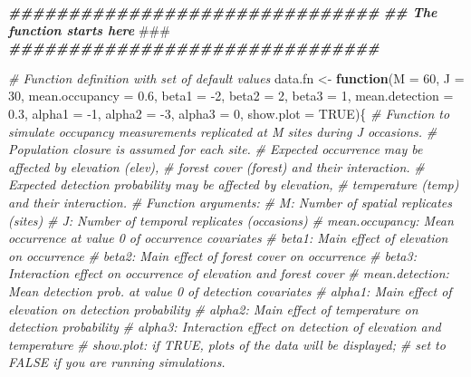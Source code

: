 \documentclass[
]{book}
\newenvironment{Shaded}{\begin{snugshade}}{\end{snugshade}}
\newcommand{\AlertTok}[1]{\textcolor[rgb]{0.94,0.16,0.16}{#1}}
\newcommand{\AttributeTok}[1]{\textcolor[rgb]{0.77,0.63,0.00}{#1}}
\newcommand{\CommentTok}[1]{\textcolor[rgb]{0.56,0.35,0.01}{\textit{#1}}}
\newcommand{\ConstantTok}[1]{\textcolor[rgb]{0.00,0.00,0.00}{#1}}
\newcommand{\ControlFlowTok}[1]{\textcolor[rgb]{0.13,0.29,0.53}{\textbf{#1}}}
\newcommand{\DecValTok}[1]{\textcolor[rgb]{0.00,0.00,0.81}{#1}}
\newcommand{\DocumentationTok}[1]{\textcolor[rgb]{0.56,0.35,0.01}{\textbf{\textit{#1}}}}
\newcommand{\FloatTok}[1]{\textcolor[rgb]{0.00,0.00,0.81}{#1}}
\newcommand{\NormalTok}[1]{#1}
\newcommand{\OtherTok}[1]{\textcolor[rgb]{0.56,0.35,0.01}{#1}}
\newcommand{\SpecialCharTok}[1]{\textcolor[rgb]{0.00,0.00,0.00}{#1}}
\begin{document}
\begin{Shaded}
\begin{Highlighting}[]
\DocumentationTok{\#\#\#\#\#\#\#\#\#\#\#\#\#\#\#\#\#\#\#\#\#\#\#\#\#\#\#\#\#\#\#}
\DocumentationTok{\#\# The function starts here }\AlertTok{\#\#\#}
\DocumentationTok{\#\#\#\#\#\#\#\#\#\#\#\#\#\#\#\#\#\#\#\#\#\#\#\#\#\#\#\#\#\#\#}

\CommentTok{\# Function definition with set of default values}
\NormalTok{data.fn }\OtherTok{\textless{}{-}} \ControlFlowTok{function}\NormalTok{(}\AttributeTok{M =} \DecValTok{60}\NormalTok{, }\AttributeTok{J =} \DecValTok{30}\NormalTok{, }\AttributeTok{mean.occupancy =} \FloatTok{0.6}\NormalTok{, }
                    \AttributeTok{beta1 =} \SpecialCharTok{{-}}\DecValTok{2}\NormalTok{, }\AttributeTok{beta2 =} \DecValTok{2}\NormalTok{, }\AttributeTok{beta3 =} \DecValTok{1}\NormalTok{, }\AttributeTok{mean.detection =} \FloatTok{0.3}\NormalTok{, }
                    \AttributeTok{alpha1 =} \SpecialCharTok{{-}}\DecValTok{1}\NormalTok{, }\AttributeTok{alpha2 =} \SpecialCharTok{{-}}\DecValTok{3}\NormalTok{, }\AttributeTok{alpha3 =} \DecValTok{0}\NormalTok{, }\AttributeTok{show.plot =} \ConstantTok{TRUE}\NormalTok{)\{}
\CommentTok{\# Function to simulate occupancy measurements replicated at M sites during J occasions.}
\CommentTok{\# Population closure is assumed for each site.}
\CommentTok{\# Expected occurrence may be affected by elevation (elev), }
\CommentTok{\# forest cover (forest) and their interaction.}
\CommentTok{\# Expected detection probability may be affected by elevation, }
\CommentTok{\# temperature (temp) and their interaction.}
\CommentTok{\# Function arguments:}
\CommentTok{\#     M: Number of spatial replicates (sites)}
\CommentTok{\#     J: Number of temporal replicates (occasions)}
\CommentTok{\#     mean.occupancy: Mean occurrence at value 0 of occurrence covariates}
\CommentTok{\#     beta1: Main effect of elevation on occurrence}
\CommentTok{\#     beta2: Main effect of forest cover on occurrence}
\CommentTok{\#     beta3: Interaction effect on occurrence of elevation and forest cover}
\CommentTok{\#     mean.detection: Mean detection prob. at value 0 of detection covariates}
\CommentTok{\#     alpha1: Main effect of elevation on detection probability}
\CommentTok{\#     alpha2: Main effect of temperature on detection probability}
\CommentTok{\#     alpha3: Interaction effect on detection of elevation and temperature}
\CommentTok{\#     show.plot: if TRUE, plots of the data will be displayed; }
\CommentTok{\#               set to FALSE if you are running simulations.}


\end{Highlighting}
\end{Shaded}
\end{document}
